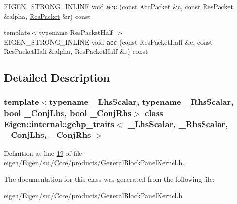 \begin{DoxyCompactItemize}
\item 
\mbox{\label{class_eigen_1_1internal_1_1gebp__traits_a52b30a1314c29a3396bbaa44add57646}} 
E\+I\+G\+E\+N\+\_\+\+S\+T\+R\+O\+N\+G\+\_\+\+I\+N\+L\+I\+NE void {\bfseries acc} (const \hyperlink{class_eigen_1_1internal_1_1_tensor_lazy_evaluator_writable}{Acc\+Packet} \&c, const \hyperlink{class_eigen_1_1internal_1_1_tensor_lazy_evaluator_writable}{Res\+Packet} \&alpha, \hyperlink{class_eigen_1_1internal_1_1_tensor_lazy_evaluator_writable}{Res\+Packet} \&r) const
\item 
\mbox{\label{class_eigen_1_1internal_1_1gebp__traits_a29ddd7548d8516711c78c049d9d89aa7}} 
{\footnotesize template$<$typename Res\+Packet\+Half $>$ }\\E\+I\+G\+E\+N\+\_\+\+S\+T\+R\+O\+N\+G\+\_\+\+I\+N\+L\+I\+NE void {\bfseries acc} (const Res\+Packet\+Half \&c, const Res\+Packet\+Half \&alpha, Res\+Packet\+Half \&r) const
\end{DoxyCompactItemize}


\subsection{Detailed Description}
\subsubsection*{template$<$typename \+\_\+\+Lhs\+Scalar, typename \+\_\+\+Rhs\+Scalar, bool \+\_\+\+Conj\+Lhs, bool \+\_\+\+Conj\+Rhs$>$\newline
class Eigen\+::internal\+::gebp\+\_\+traits$<$ \+\_\+\+Lhs\+Scalar, \+\_\+\+Rhs\+Scalar, \+\_\+\+Conj\+Lhs, \+\_\+\+Conj\+Rhs $>$}



Definition at line \hyperlink{eigen_2_eigen_2src_2_core_2products_2_general_block_panel_kernel_8h_source_l00019}{19} of file \hyperlink{eigen_2_eigen_2src_2_core_2products_2_general_block_panel_kernel_8h_source}{eigen/\+Eigen/src/\+Core/products/\+General\+Block\+Panel\+Kernel.\+h}.



The documentation for this class was generated from the following file\+:\begin{DoxyCompactItemize}
\item 
eigen/\+Eigen/src/\+Core/products/\+General\+Block\+Panel\+Kernel.\+h\end{DoxyCompactItemize}

